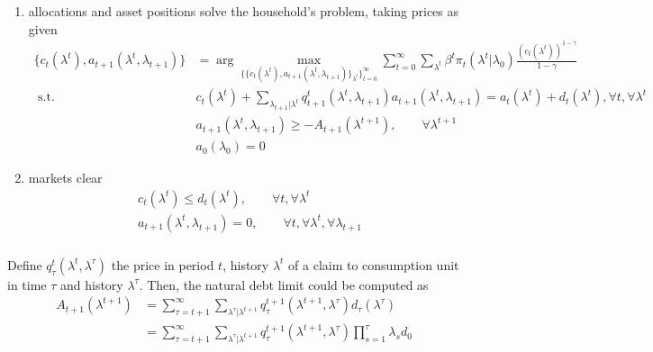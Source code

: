 \documentclass[]{article}
\begin{document}
\begin{enumerate}[label = \roman*)]
	\item allocations and asset positions solve the household's problem, taking prices as given
	\begin{equation}
	\begin{split}
		\{c_t(\lambda^t), a_{t+1}(\lambda^t, \lambda_{t+1})\}& = \arg\max\limits_{\{\{c_t(\lambda^t), a_{t+1}(\lambda^t, \lambda_{t+1})\}_{\lambda^t}\}_{t = 0}^\infty}\sum\limits_{t = 0}^\infty\sum\limits_{\lambda^t}\beta^t\pi_t(\lambda^t|\lambda_0)\frac{(c_t(\lambda^t))^{1-\gamma}}{1 - \gamma}\\
		\text{ s.t. }&c_t(\lambda^t) + \sum\limits_{\lambda_{t+1}|\lambda^t}q_{t+1}^t(\lambda^t, \lambda_{t+1})a_{t+1}(\lambda^t, \lambda_{t+1}) = a_{t}(\lambda^t) + d_t(\lambda^t), \forall t, \forall \lambda^t \\
		&a_{t+1}(\lambda^t, \lambda_{t+1}) \geq -A_{t+1}(\lambda^{t+1}), \qquad\forall \lambda^{t+1}\\
		&a_0(\lambda_0) = 0\nonumber
	\end{split}
	\end{equation}
	\item markets clear
	\begin{equation}
		\begin{split}
			&c_t(\lambda^t) \leq d_t(\lambda^t), \qquad\forall t, \forall\lambda^t \\
			&a_{t+1}(\lambda^t, \lambda_{t+1}) = 0, \qquad\forall t, \forall\lambda^t, \forall\lambda_{t+1}\nonumber
		\end{split}
	\end{equation}
\end{enumerate}

\subsubsection{}

Define $q_\tau^{t}(\lambda^{t}, \lambda^\tau)$ the price in period $t$, history $\lambda^t$ of a claim to consumption unit in time $\tau$ and history $\lambda^\tau$. Then, the natural debt limit could be computed as
\begin{equation}
	\begin{split}
		A_{t+1}(\lambda^{t+1})& = \sum\limits_{\tau = t+1}^\infty\sum\limits_{\lambda^\tau|\lambda^{t+1}}q_\tau^{t+1}(\lambda^{t+1}, \lambda^\tau)d_\tau(\lambda^\tau) \\
		& = \sum\limits_{\tau = t+1}^\infty\sum\limits_{\lambda^\tau|\lambda^{t+1}}q_\tau^{t+1}(\lambda^{t+1}, \lambda^\tau)\prod\limits_{s = 1}^\tau\lambda_sd_0 \nonumber
	\end{split}
\end{equation}
\end{document}
